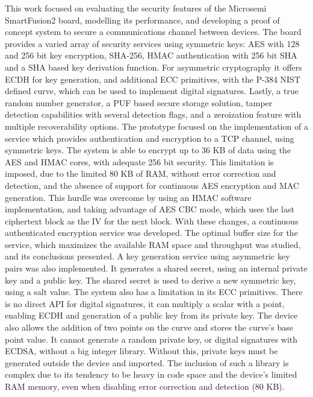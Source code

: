 \cleardoublepage
\label{chap:conclusion}

This work focused on evaluating the security features of the Microsemi SmartFusion2 board, modelling its performance, and developing a proof of concept system to secure a communications channel between devices.
The board provides a varied array of security services using symmetric keys: AES with 128 and 256 bit key encryption, SHA-256, HMAC authentication with 256 bit SHA and a SHA based key derivation function. For asymmetric cryptography it offers ECDH for key generation, and additional ECC primitives, with the P-384 NIST defined curve, which can be used to implement digital signatures. Lastly, a true random number generator, a PUF based secure storage solution, tamper detection capabilities with several detection flags, and a zeroization feature with multiple recoverability options.
The prototype focused on the implementation of a service which provides authentication and encryption to a TCP channel, using symmetric keys. The system is able to encrypt up to 36 KB of data using the AES and HMAC cores, with adequate 256 bit security. This limitation is imposed, due to the limited 80 KB of RAM, without error correction and detection, and the absence of support for continuous AES encryption and MAC generation. This hurdle was overcome by using an HMAC software implementation, and taking advantage of AES CBC mode, which uses the last ciphertext block as the IV for the next block. With these changes, a continuous authenticated encryption service was developed. The optimal buffer size for the service, which maximizes the available RAM space and throughput was studied, and its conclusions presented.
A key generation service using asymmetric key pairs was also implemented. It generates a shared secret, using an internal private key and a public key. The shared secret is used to derive a new symmetric key, using a salt value.
The system also has a limitation in its ECC primitives. There is no direct API for digital signatures, it can multiply a scalar with a point, enabling ECDH and generation of a public key from its private key. The device also allows the addition of two points on the curve and stores the curve's base point value. It cannot generate a random private key, or digital signatures with ECDSA, without a big integer library. Without this, private keys must be generated outside the device and imported. The inclusion of such a library is complex due to its tendency to be heavy in code space and the device's limited RAM memory, even when disabling error correction and detection (80 KB). 
